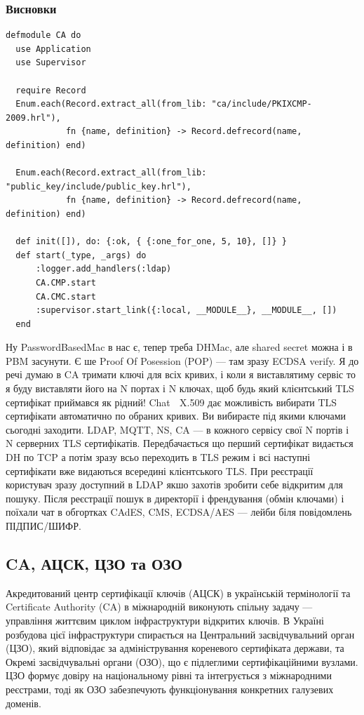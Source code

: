 \newpage
\subsubsection{Висновки}

\begin{lstlisting}
defmodule CA do
  use Application
  use Supervisor

  require Record
  Enum.each(Record.extract_all(from_lib: "ca/include/PKIXCMP-2009.hrl"),
            fn {name, definition} -> Record.defrecord(name, definition) end)

  Enum.each(Record.extract_all(from_lib: "public_key/include/public_key.hrl"),
            fn {name, definition} -> Record.defrecord(name, definition) end)

  def init([]), do: {:ok, { {:one_for_one, 5, 10}, []} }
  def start(_type, _args) do
      :logger.add_handlers(:ldap)
      CA.CMP.start
      CA.CMC.start
      :supervisor.start_link({:local, __MODULE__}, __MODULE__, [])
  end
\end{lstlisting}

Ну PasswordBasedMac в нас є, тепер треба DHMac, але shared secret можна і в PBM засунути. Є ше Proof Of Posession (POP) — там зразу ECDSA verify. Я до речі думаю в CA тримати ключі для всіх кривих, і коли я виставлятиму сервіс то я буду виставляти його на N портах і N ключах, щоб будь який клієнтський TLS сертифікат приймався як рідний! Chat 💬 X.509 дає можливість вибирати TLS сертифікати автоматично по обраних кривих. Ви вибираєте під якими ключами сьогодні заходити. LDAP, MQTT, NS, CA — в кожного сервісу свої N портів і N серверних TLS сертифікатів. Передбачається що перший сертифікат видається DH по TCP а потім зразу всьо переходить в TLS режим і всі наступні сертифікати вже видаються всередині клієнтського TLS. При реєстрації користувач зразу доступний в LDAP якшо захотів зробити себе відкритим для пошуку. Після реєстрації пошук в директорії і френдування (обмін ключами) і поїхали чат в обгортках CAdES, CMS, ECDSA/AES — лейби біля повідомлень ПІДПИС/ШИФР.

\subsection{CA, АЦСК, ЦЗО та ОЗО}

Акредитований центр сертифікації ключів (АЦСК) в українській термінології та Certificate Authority (CA) в міжнародній виконують спільну задачу — управління життєвим циклом інфраструктури відкритих ключів. В Україні розбудова цієї інфраструктури спирається на Центральний засвідчувальний орган (ЦЗО), який відповідає за адміністрування кореневого сертифіката держави, та Окремі засвідчувальні органи (ОЗО), що є підлеглими сертифікаційними вузлами. ЦЗО формує довіру на національному рівні та інтегрується з міжнародними реєстрами, тоді як ОЗО забезпечують функціонування конкретних галузевих доменів.

